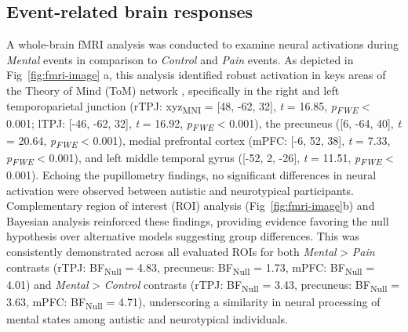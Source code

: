 \subsection*{Event-related brain responses}
A whole-brain fMRI analysis was conducted to examine neural activations during \textit{Mental} events in comparison to \textit{Control} and \textit{Pain} events. As depicted in Fig~\ref{fig:fmri-image} a, this analysis identified robust activation in keys areas of the Theory of Mind (ToM) network \citep{schurz2014}, specifically in the right and left temporoparietal junction (rTPJ: xyz\textsubscript{MNI} = [48, -62, 32], \textit{t} = 16.85, \textit{p\textsubscript{FWE}} < 0.001; lTPJ: [-46, -62, 32], \textit{t} = 16.92, \textit{p\textsubscript{FWE}} < 0.001), the precuneus ([6, -64, 40], \textit{t} = 20.64, \textit{p\textsubscript{FWE}} < 0.001), medial prefrontal cortex (mPFC: [-6, 52, 38], \textit{t} = 7.33, \textit{p\textsubscript{FWE}} < 0.001), and left middle temporal gyrus ([-52, 2, -26], \textit{t} = 11.51, \textit{p\textsubscript{FWE}} < 0.001). Echoing the pupillometry findings, no significant differences in neural activation were observed between autistic and neurotypical participants. Complementary region of interest (ROI) analysis (Fig~\ref{fig:fmri-image}b) and Bayesian analysis reinforced these findings, providing evidence favoring the null hypothesis over alternative models suggesting group differences. This was consistently demonstrated across all evaluated ROIs for both \textit{Mental} > \textit{Pain} contrasts (rTPJ: BF\textsubscript{Null} = 4.83, precuneus: BF\textsubscript{Null} = 1.73, mPFC: BF\textsubscript{Null} = 4.01) and \textit{Mental} > \textit{Control} contrasts (rTPJ: BF\textsubscript{Null} = 3.43, precuneus: BF\textsubscript{Null} = 3.63,  mPFC: BF\textsubscript{Null} = 4.71), underscoring a similarity in neural processing of mental states among autistic and neurotypical individuals.


